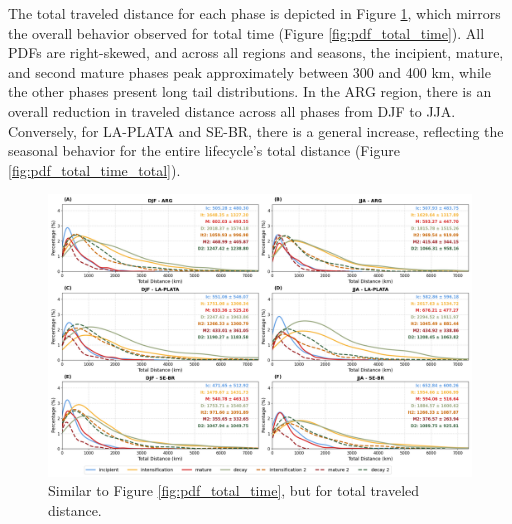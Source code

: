 The total traveled distance for each phase is depicted in Figure \ref{fig:pdf_total_distance}, which mirrors the overall behavior observed for total time (Figure \ref{fig:pdf_total_time}). All PDFs are right-skewed, and across all regions and seasons, the incipient, mature, and second mature phases peak approximately between 300 and 400 km, while the other phases present long tail distributions. In the ARG region, there is an overall reduction in traveled distance across all phases from DJF to JJA. Conversely, for LA-PLATA and SE-BR, there is a general increase, reflecting the seasonal behavior for the entire lifecycle's total distance (Figure \ref{fig:pdf_total_time_total}).

\begin{figure}[h!]
\centering
\includegraphics[width=\textwidth]{figs_4/pdf_total_distance.png}
\caption[PDF - Total Distance]{Similar to Figure \ref{fig:pdf_total_time}, but for total traveled distance.}
\label{fig:pdf_total_distance}
\end{figure}

